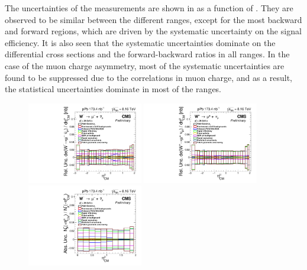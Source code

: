 

The uncertainties of the measurements are shown in  as a function of \etaMuCM. They are observed to be similar between the different \etaMuCM ranges, except for the most backward and forward regions, which are driven by the systematic uncertainty on the signal efficiency. It is also seen that the systematic uncertainties dominate on the \WToMuNupm differential cross sections and the forward-backward ratios in all \etaMuCM ranges. In the case of the muon charge asymmetry, most of the systematic uncertainties are found to be suppressed due to the correlations in muon charge, and as a result, the statistical uncertainties dominate in most of the \etaMuCM ranges.

\begin{figure}[!htbp]
 \centering
 \includegraphics[width=0.45\textwidth]{Figures/WBoson/Analysis/Systematics/gr_WToMuMi_PA_Cross_Section_EffTnP.pdf}
 \includegraphics[width=0.45\textwidth]{Figures/WBoson/Analysis/Systematics/gr_WToMuPl_PA_Cross_Section_EffTnP.pdf}
\\
 \includegraphics[width=0.45\textwidth]{Figures/WBoson/Analysis/Systematics/gr_WToMuMi_PA_ForwardBackward_Ratio_EffTnP.pdf}

\end{figure}

